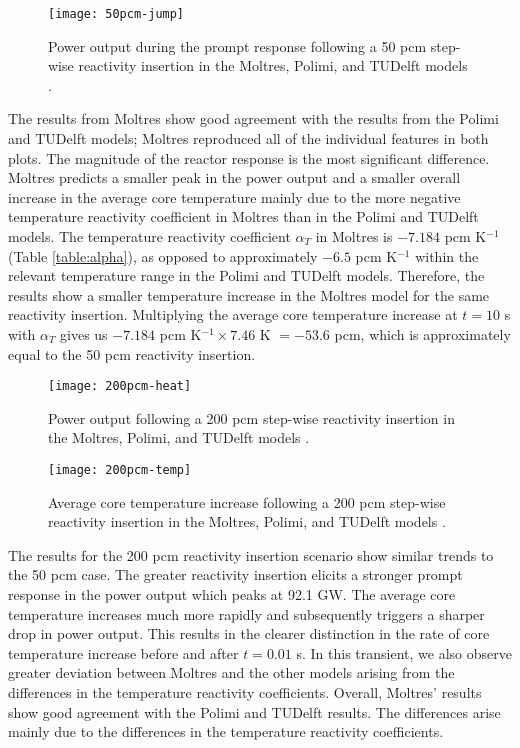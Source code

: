 \begin{figure}[htbp!]
    \centering
    \texttt{[image: 50pcm-jump]}
    \caption{Power output during the prompt response following
    a 50 pcm step-wise reactivity insertion in the Moltres, Polimi, and
    TUDelft models \cite{fiorina_modelling_2014}.}
    \label{fig:50pcmjump}
\end{figure}

The results from Moltres show good agreement with the results from the Polimi
and TUDelft models; Moltres reproduced all of the individual features in both
plots. The magnitude of the reactor response is the most significant
difference. Moltres predicts a smaller peak in the power output and a smaller
overall increase in the average core temperature mainly due to the
more negative temperature reactivity coefficient in Moltres than in the Polimi
and TUDelft models. The temperature reactivity coefficient $\alpha_T$ in
Moltres is $-7.184$ pcm K$^{-1}$ (Table \ref{table:alpha}), as opposed to
approximately $-6.5$ pcm K$^{-1}$ within the relevant temperature range in the
Polimi and TUDelft models. Therefore, the results show a smaller temperature
increase in the Moltres model for the same reactivity insertion. Multiplying
the average
core temperature increase at $t=10$ s with $\alpha_T$ gives us $-7.184$ pcm
K$^{-1} \times 7.46$ K $= -53.6$ pcm, which is approximately equal to the 50
pcm reactivity insertion.

\begin{figure}[htbp!]
    \centering
    \texttt{[image: 200pcm-heat]}
    \caption{Power output following
    a 200 pcm step-wise reactivity insertion in the Moltres, Polimi, and
    TUDelft models \cite{fiorina_modelling_2014}.}
    \label{fig:200pcmheat}
%
    \centering
    \texttt{[image: 200pcm-temp]}
    \caption{Average core temperature increase following
    a 200 pcm step-wise reactivity insertion in the Moltres, Polimi, and
    TUDelft models \cite{fiorina_modelling_2014}.}
    \label{fig:200pcmtemp}
\end{figure}

The results for the 200 pcm reactivity insertion scenario show similar trends
to the 50 pcm case. The greater reactivity insertion elicits a stronger
prompt response in the power output which peaks at 92.1 GW. The average core
temperature increases much more rapidly and subsequently triggers a sharper
drop in power output. This results in the clearer distinction in the rate of
core temperature increase before and after $t=0.01$ s. In this transient, we
also observe greater deviation between Moltres and the other models arising
from the differences in the temperature reactivity coefficients. Overall,
Moltres' results show good agreement with the Polimi and TUDelft results.
The differences arise mainly due to the differences in the temperature
reactivity coefficients.

